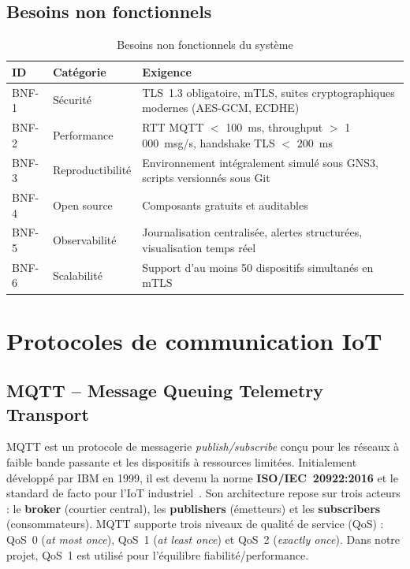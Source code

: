 \subsection{Besoins non fonctionnels}

\begin{table}[H]
\centering
\caption{Besoins non fonctionnels du système}
\label{tab:bnf}
\begin{tabular}{llp{6cm}}
\toprule
\textbf{ID} & \textbf{Catégorie} & \textbf{Exigence} \\
\midrule
BNF-1 & Sécurité & TLS~1.3 obligatoire, mTLS, suites cryptographiques modernes (AES-GCM, ECDHE) \\
BNF-2 & Performance & RTT MQTT $<$ 100~ms, throughput $>$ 1\,000~msg/s, handshake TLS $<$ 200~ms \\
BNF-3 & Reproductibilité & Environnement intégralement simulé sous GNS3, scripts versionnés sous Git \\
BNF-4 & Open source & Composants gratuits et auditables \\
BNF-5 & Observabilité & Journalisation centralisée, alertes structurées, visualisation temps réel \\
BNF-6 & Scalabilité & Support d'au moins 50 dispositifs simultanés en mTLS \\
\bottomrule
\end{tabular}
\end{table}

\section{Protocoles de communication IoT}

\subsection{MQTT -- Message Queuing Telemetry Transport}

MQTT est un protocole de messagerie \textit{publish/subscribe} conçu pour les réseaux à faible bande passante et les dispositifs à ressources limitées. Initialement développé par IBM en 1999, il est devenu la norme \textbf{ISO/IEC~20922:2016} et le standard de facto pour l'IoT industriel~\cite{mqtt5}. Son architecture repose sur trois acteurs : le \textbf{broker} (courtier central), les \textbf{publishers} (émetteurs) et les \textbf{subscribers} (consommateurs). MQTT supporte trois niveaux de qualité de service (\ac{QoS}) : QoS~0 (\textit{at most once}), QoS~1 (\textit{at least once}) et QoS~2 (\textit{exactly once}). Dans notre projet, QoS~1 est utilisé pour l'équilibre fiabilité/performance.


